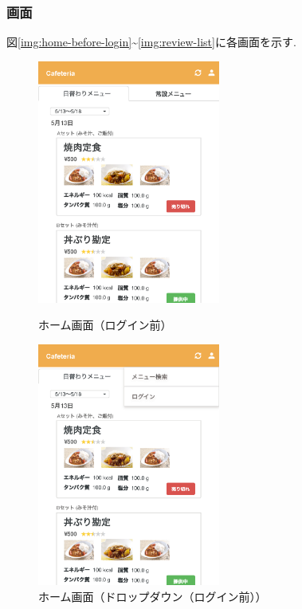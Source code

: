 \documentclass[a4paper]{ltjsarticle}
\begin{document}
    \subsubsection{画面}
        図\ref{img:home-before-login}\sim\ref{img:review-list}に各画面を示す.
        \begin{figure}[ht]
            \begin{minipage}[t]{.49\textwidth}
                \center
                \includegraphics[width=60mm]{ui/home-before-login.png}
                \caption{ホーム画面（ログイン前）}
                \label{img:home-before-login}
            \end{minipage}
            \begin{minipage}[t]{.49\textwidth}
                \center
                \includegraphics[width=60mm]{ui/home-dropdown-before-login.png}
                \caption{ホーム画面（ドロップダウン（ログイン前））}
                \label{img:home-dropdown-before-login}
            \end{minipage}
        \end{figure}
\end{document}
